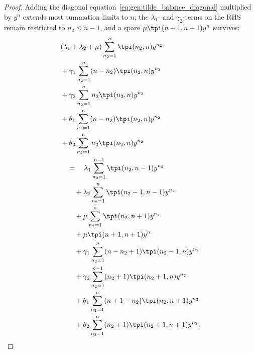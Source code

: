 \begin{proof}
    Adding the diagonal equation~\eqref{eq:gen:tilde_balance_diagonal} multiplied by $y^n$ extends most summation limits to $n$; the $\lambda_1$- and $\gamma_2$-terms on the RHS remain restricted to $n_2\le n-1$, and a spare $\mu\tpi(n+1,n+1)y^n$ survives:
    \begin{align*}
        \begin{split}
            & (\lambda_1+\lambda_2+\mu) \sum_{n_2=1}^{n} \tpi(n_2,n) y^{n_2} \\
            & + \gamma_1 \sum_{n_2=1}^{n} (n-n_2) \tpi(n_2,n) y^{n_2} \\
            & + \gamma_2 \sum_{n_2=1}^{n} n_2 \tpi(n_2,n) y^{n_2} \\
            & + \theta_1 \sum_{n_2=1}^{n} (n-n_2) \tpi(n_2,n) y^{n_2} \\
            & + \theta_2 \sum_{n_2=1}^{n} n_2 \tpi(n_2,n) y^{n_2} \\
            & \quad = \quad \lambda_1 \sum_{n_2=1}^{n-1} \tpi(n_2,n-1) y^{n_2} \\
            & \quad \quad + \lambda_2 \sum_{n_2=1}^{n} \tpi(n_2-1,n-1) y^{n_2} \\
            & \quad \quad + \mu \sum_{n_2=1}^{n} \tpi(n_2,n+1) y^{n_2} \\
            & \quad \quad + \mu \tpi(n+1,n+1) y^n \\
            & \quad \quad + \gamma_1 \sum_{n_2=1}^{n} (n-n_2+1) \tpi(n_2-1,n) y^{n_2} \\
            & \quad \quad + \gamma_2 \sum_{n_2=1}^{n-1} (n_2+1) \tpi(n_2+1,n) y^{n_2} \\
            & \quad \quad + \theta_1 \sum_{n_2=1}^{n} (n+1-n_2) \tpi(n_2,n+1) y^{n_2} \\
            & \quad \quad + \theta_2 \sum_{n_2=1}^{n} (n_2+1) \tpi(n_2+1,n+1) y^{n_2}.
        \end{split}
    \end{align*}
    

\end{proof}
